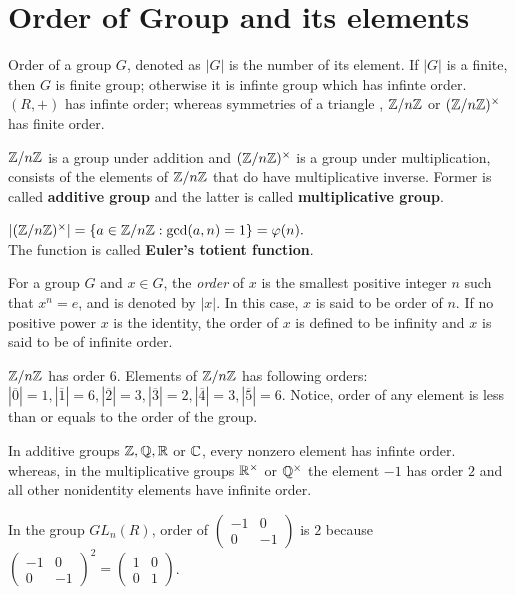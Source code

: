 \section{Order of Group and its elements}
Order of a group $G$, denoted as $|G|$ is the number of its element. If $|G|$ is a finite, then $G$ is finite group; otherwise it is infinte group which has infinte order. $(R, +)$ has infinte order; whereas symmetries of a triangle , $\mathbb{Z}/n\mathbb{Z}$ or $(\mathbb{Z}/n\mathbb{Z})^{\times}$ has finite order.
\begin{note}
$\mathbb{Z}/n\mathbb{Z}$ is a group under addition and $(\mathbb{Z}/n\mathbb{Z})^{\times}$ is a group under multiplication, consists of the elements of $\mathbb{Z}/n\mathbb{Z}$ that do have multiplicative inverse. Former is called \textbf{additive group} and the latter is called \textbf{multiplicative group}.
\end{note}
\begin{eg}
    $|(\mathbb{Z}/n\mathbb{Z})^\times| = \{a \in \mathbb{Z}/n\mathbb{Z} : \text{gcd}(a, n) = 1\}  =\varphi(n).$\\
    The function is called \textbf{Euler's totient function}.
\end{eg}
\begin{definition}
    For a group $G$ and $x \in G$, the \textit{order} of $x$ is the smallest positive integer $n$ such that $x^n = e$, and is denoted by $|x|$. In this case, $x$ is said to be order of $n$. If no positive power $x$ is the identity, the order of $x$ is defined to be infinity and $x$ is said to be of infinite order.
\end{definition}
\begin{eg}
    $\mathbb{Z}/n\mathbb{Z}$ has order $6$. Elements of $\mathbb{Z}/n\mathbb{Z}$ has following orders: $|\overline{0}|=1, |\overline{1}|=6, |\overline{2}|=3, |\overline{3}|=2, |\overline{4}|=3, |\overline{5}|=6$. Notice, order of any element is less than or equals to the order of the group.
\end{eg}
\begin{eg}
    In additive groups $\mathbb{Z}, \mathbb{Q}, \mathbb{R}$ or $\mathbb{C}$, every nonzero element has infinte order. whereas, in the multiplicative groups $\mathbb{R}^\times$ or $\mathbb{Q}^\times$ the element $-1$ has order $2$ and all other nonidentity elements have infinite order.
\end{eg}
\begin{eg}
    In the group $GL_n(R)$, order of
    $\begin{pmatrix}
    -1 & 0\\
    0 & -1
    \end{pmatrix}$ is $2$ because
    $\begin{pmatrix}
    -1 & 0\\
    0 & -1
    \end{pmatrix}^2
    = \begin{pmatrix}
    1 & 0\\
    0 & 1
    \end{pmatrix}$.
\end{eg}
